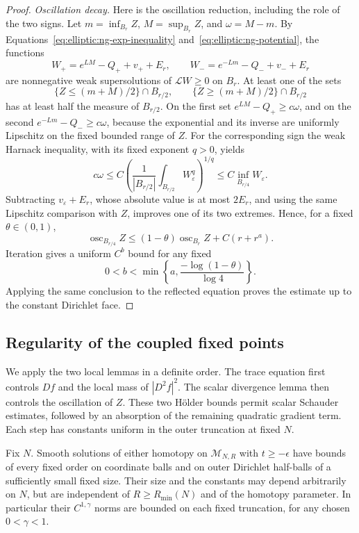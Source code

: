 \begin{proof}
\medskip\noindent\emph{Oscillation decay.}
Here is the oscillation reduction, including the role of the two
signs.  Let $m=\inf_{B_r}Z$, $M=\sup_{B_r}Z$, and $\omega=M-m$.
By Equations~\eqref{eq:elliptic:ng-exp-inequality} and~\eqref{eq:elliptic:ng-potential}, the functions
\[
 W_+=e^{LM}-Q_++v_++E_r,
 \qquad
 W_-=e^{-Lm}-Q_-+v_-+E_r
\]
are nonnegative weak supersolutions of $\mathcal L W\ge0$ on $B_r$.
At least one of the sets
\[
 \{Z\le(m+M)/2\}\cap B_{r/2},\qquad
 \{Z\ge(m+M)/2\}\cap B_{r/2}
\]
has at least half the measure of $B_{r/2}$.  On the first set
$e^{LM}-Q_+\ge c\omega$, and on the second
$e^{-Lm}-Q_-\ge c\omega$, because the exponential and its inverse
are uniformly Lipschitz on the fixed bounded range of $Z$.
For the corresponding sign the weak Harnack inequality, with its
fixed exponent $q>0$, yields
\[
 c\omega\le
 C\left(\frac1{|B_{r/2}|}\int_{B_{r/2}}W_\varepsilon^q\right)^{1/q}
 \le C\inf_{B_{r/4}}W_\varepsilon.
\]
Subtracting $v_\varepsilon+E_r$, whose absolute value is at most
$2E_r$, and using the same Lipschitz comparison with $Z$, improves
one of its two extremes.  Hence, for a fixed $\theta\in(0,1)$,
\begin{equation}\label{eq:elliptic:ng-oscillation-decay}
 \operatorname{osc}_{B_{r/4}}Z
 \le (1-\theta)\operatorname{osc}_{B_r}Z+C(r+r^a).
\end{equation}
Iteration gives a uniform $C^b$ bound for any fixed
\[
 0<b<\min\left\{a,\frac{-\log(1-\theta)}{\log4}\right\}.
\]
Applying the same conclusion to the reflected equation proves the
estimate up to the constant Dirichlet face.

\end{proof}

\subsection{Regularity of the coupled fixed points}

We apply the two local lemmas in a definite order.  The trace equation
first controls $Df$ and the local mass of $|D^2f|^2$.  The scalar
divergence lemma then controls the oscillation of $Z$.  These two
H\"older bounds permit scalar Schauder estimates, followed by an
absorption of the remaining quadratic gradient term.  Each step has
constants uniform in the outer truncation at fixed $N$.

\begin{proposition}\label{prop:elliptic:regularity}
Fix $N$.  Smooth solutions of either homotopy on $\mathcal M_{N,R}$
with $t\ge-\epsilon$ have bounds of every fixed order on coordinate
balls and on outer Dirichlet half-balls of a sufficiently small fixed
size.  Their size and the constants may depend arbitrarily on $N$,
but are independent of $R\ge R_{\min}(N)$ and of the homotopy
parameter.  In particular their $C^{1,\gamma}$ norms are bounded on
each fixed truncation, for any chosen $0<\gamma<1$.
\end{proposition}

